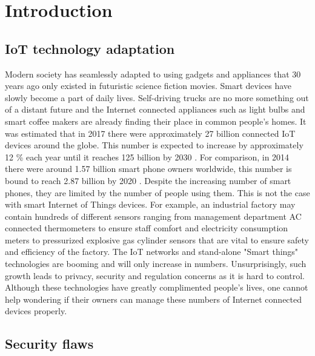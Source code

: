 \section{Introduction}

\subsection{IoT technology adaptation}
Modern society has seamlessly adapted to using gadgets and appliances that 30 years ago only existed in futuristic science fiction movies. Smart devices have slowly become a part of daily lives. Self-driving trucks are no more something out of a distant future\cite{freedman_2017} and the Internet connected appliances such as light bulbs and smart coffee makers are already finding their place in common people’s homes. It was estimated that in 2017 there were approximately 27 billion connected IoT devices around the globe. This number is expected to increase by approximately 12 \% each year until it reaches 125 billion by 2030 \cite{ihs-markit}. For comparison, in 2014 there were around 1.57 billion smart phone owners worldwide, this number is bound to reach 2.87 billion by 2020 \cite{statista}. Despite the increasing number of smart phones, they are limited by the number of people using them. This is not the case with smart Internet of Things devices. For example, an industrial factory may contain hundreds of different sensors ranging from management department AC connected thermometers to ensure staff comfort and electricity consumption meters to pressurized explosive gas cylinder sensors that are vital to ensure safety and efficiency of the factory. The IoT networks and stand-alone "Smart things" technologies are booming \cite{gartner2018} and will only increase in numbers. Unsurprisingly, such growth leads to privacy, security and regulation concerns as it is hard to control. Although these technologies have greatly complimented people’s lives, one cannot help wondering if their owners can manage these numbers of Internet connected devices properly.

\subsection{Security flaws}

